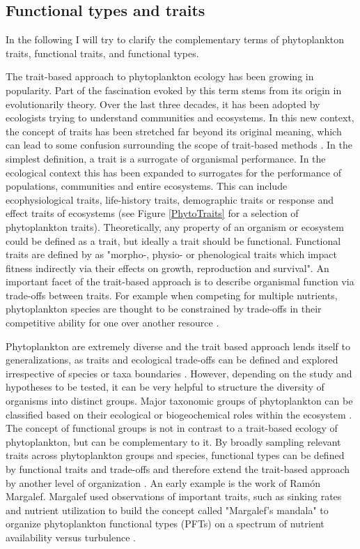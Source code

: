 \subsection{Functional types and traits}
In the following I will try to clarify the complementary terms of phytoplankton traits, functional traits, and functional types. 

The trait-based approach to phytoplankton ecology has been growing in popularity. Part of the fascination evoked by this term stems from its origin in evolutionarily theory. Over the last three decades, it has been adopted by ecologists trying to understand communities and ecosystems. In this new context, the concept of traits has been stretched far beyond its original meaning, which can lead to some confusion surrounding the scope of trait-based methods \citep{Violle2007c}. In the simplest definition, a trait is a surrogate of organismal performance. In the ecological context this has been expanded to surrogates for the performance of populations, communities and entire ecosystems. This can include ecophysiological traits, life-history traits, demographic traits or response and effect traits of ecosystems (see Figure \ref{PhytoTraits} for a selection of phytoplankton traits). Theoretically, any property of an organism or ecosystem could be defined as a trait, but ideally a trait should be functional. Functional traits are defined by \cite{Violle2007c} as "morpho-, physio- or phenological traits which impact fitness indirectly via their effects on growth, reproduction and survival". An important facet of the trait-based approach is to describe organismal function via trade-offs between traits. For example when competing for multiple nutrients, phytoplankton species are thought to be constrained by trade-offs in their competitive ability for one over another resource \citep{Tilman1990}. 

Phytoplankton are extremely diverse and the trait based approach lends itself to generalizations, as traits and ecological trade-offs can be defined and explored irrespective of species or taxa boundaries \citep{McGill2006}. However, depending on the study and hypotheses to be tested, it can be very helpful to structure the diversity of organisms into distinct groups. Major taxonomic groups of phytoplankton can be classified based on their ecological or biogeochemical roles within the ecosystem \citep{Iglesias-Rodriguez2002,Flynn2015}. The concept of functional groups is not in contrast to a trait-based ecology of phytoplankton, but can be complementary to it. By broadly sampling relevant traits across phytoplankton groups and species, functional types can be defined by functional traits and trade-offs and therefore extend the trait-based approach by another level of organization \citep{Litchman2007d}. An early example is the work of Ramón Margalef. Margalef used observations of important traits, such as sinking rates and nutrient utilization to build the concept called "Margalef's mandala" to organize phytoplankton functional types (PFTs) on a spectrum of nutrient availability versus turbulence \citep{Margalef1978}. 

